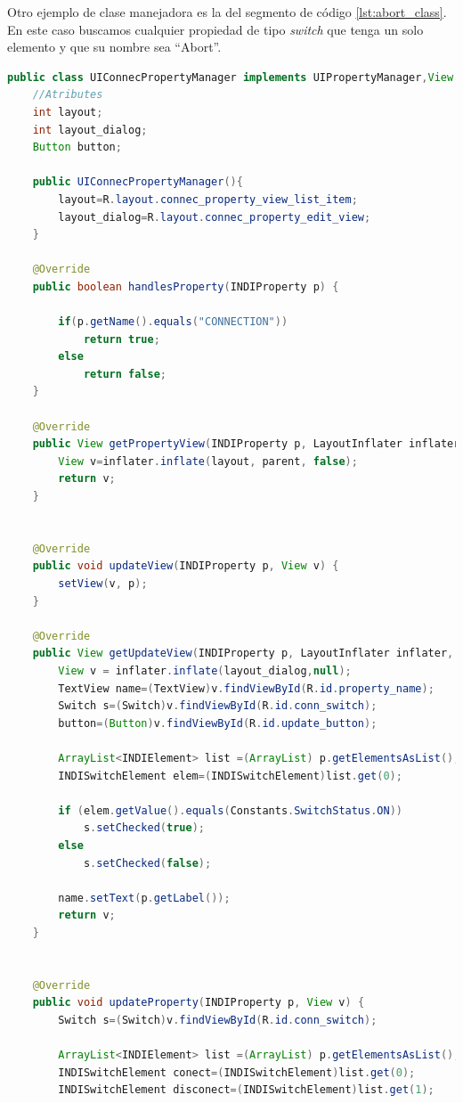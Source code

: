 \bigskip
Otro ejemplo de clase manejadora es la del segmento de código \ref{lst:abort_class}. En este caso buscamos cualquier propiedad de tipo \textit{switch} que tenga un solo elemento y que su nombre sea ``Abort''.

\begin{lstlisting}[language=Java,caption={Clase manejadora de la propiedad connection},label={lst:connect_class}]
public class UIConnecPropertyManager implements UIPropertyManager,View.OnClickListener {
    //Atributes
    int layout;
    int layout_dialog;
    Button button;

    public UIConnecPropertyManager(){
        layout=R.layout.connec_property_view_list_item;
        layout_dialog=R.layout.connec_property_edit_view;
    }

    @Override
    public boolean handlesProperty(INDIProperty p) {

        if(p.getName().equals("CONNECTION"))
            return true;
        else
            return false;
    }

    @Override
    public View getPropertyView(INDIProperty p, LayoutInflater inflater, ViewGroup parent, Context context) {
        View v=inflater.inflate(layout, parent, false);
        return v;
    }


    @Override
    public void updateView(INDIProperty p, View v) {
        setView(v, p);
    }

    @Override
    public View getUpdateView(INDIProperty p, LayoutInflater inflater, DialogFragment fragment) {
        View v = inflater.inflate(layout_dialog,null);
        TextView name=(TextView)v.findViewById(R.id.property_name);
        Switch s=(Switch)v.findViewById(R.id.conn_switch);
        button=(Button)v.findViewById(R.id.update_button);

        ArrayList<INDIElement> list =(ArrayList) p.getElementsAsList();
        INDISwitchElement elem=(INDISwitchElement)list.get(0);

        if (elem.getValue().equals(Constants.SwitchStatus.ON))
            s.setChecked(true);
        else
            s.setChecked(false);

        name.setText(p.getLabel());
        return v;
    }


    @Override
    public void updateProperty(INDIProperty p, View v) {
        Switch s=(Switch)v.findViewById(R.id.conn_switch);

        ArrayList<INDIElement> list =(ArrayList) p.getElementsAsList();
        INDISwitchElement conect=(INDISwitchElement)list.get(0);
        INDISwitchElement disconect=(INDISwitchElement)list.get(1);


\end{lstlisting}
